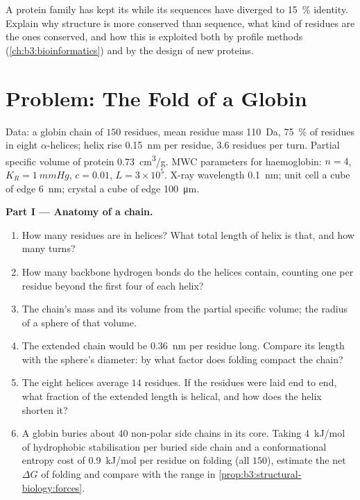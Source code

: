 \begin{exercise}[$\star\star\star$]\label{exo:b3:structural-biology:12}
A protein family has kept its  while its sequences have diverged
to \qty{15}{\%} identity. Explain why structure is more conserved than
sequence, what kind of residues are the ones conserved, and how this
is exploited both by profile methods (\cref{ch:b3:bioinformatics}) and
by the design of new proteins.
\end{exercise}

\section{Problem: The Fold of a Globin}

\begin{problem}
\label{pb:b3:structural-biology:1}
Data: a globin chain of $150$ residues, mean residue mass \qty{110}{Da},
\qty{75}{\%} of residues in eight $\alpha$-helices; helix rise
\qty{0.15}{nm} per residue, $3.6$ residues per turn. Partial specific
volume of protein \qty{0.73}{cm^3/g}. MWC parameters for haemoglobin:
$n = 4$, $K_{R} = \qty{1}{mmHg}$, $c = 0.01$, $L = 3\times 10^{5}$.
X-ray wavelength \qty{0.1}{nm}; unit cell a cube of edge \qty{6}{nm};
crystal a cube of edge \qty{100}{\micro m}.

\medskip
\noindent\textbf{Part I --- Anatomy of a chain.}
\begin{enumerate}
  \item How many residues are in helices? What total length of helix
        is that, and how many turns?
  \item How many backbone hydrogen bonds do the helices contain,
        counting one per residue beyond the first four of each helix?
  \item The chain's mass and its volume from the partial specific
        volume; the radius of a sphere of that volume.
  \item The extended chain would be \qty{0.36}{nm} per residue long.
        Compare its length with the sphere's diameter: by what factor
        does folding compact the chain?
  \item The eight helices average $14$ residues. If the residues were
        laid end to end, what fraction of the extended length is
        helical, and how does the helix shorten it?
  \item A globin buries about $40$ non-polar side chains in its core.
        Taking \qty{4}{kJ/mol} of hydrophobic stabilisation per buried
        side chain and a conformational entropy cost of
        \qty{0.9}{kJ/mol} per residue on folding (all $150$), estimate
        the net $\Delta G$ of folding and compare with the range in
        \cref{prop:b3:structural-biology:forces}.
\end{enumerate}


\end{problem}
